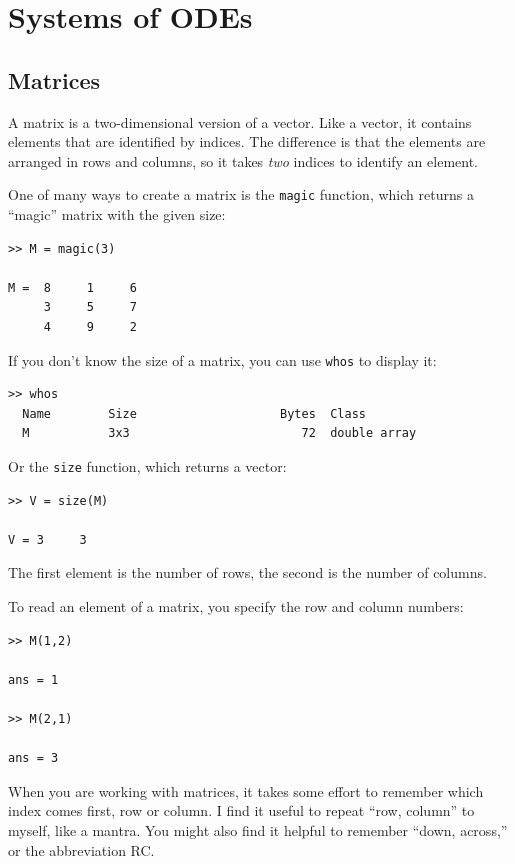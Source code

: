 \documentclass[
]{book}
\begin{document}
\chapter{Systems of ODEs}

\section{Matrices}

A matrix is a two-dimensional version of a vector.  Like a vector,
it contains elements that are identified by indices.  The difference
is that the elements are arranged in rows and columns, so it takes
{\em two} indices to identify an element.

One of many ways to create a matrix is the {\tt magic} function,
which returns a ``magic'' matrix with the given size:

\begin{verbatim}
>> M = magic(3)

M =  8     1     6
     3     5     7
     4     9     2
\end{verbatim}

If you don't know the size of a matrix, you can use {\tt whos} to
display it:

\begin{verbatim}
>> whos
  Name        Size                    Bytes  Class
  M           3x3                        72  double array
\end{verbatim}

Or the {\tt size} function, which returns a vector:

\begin{verbatim}
>> V = size(M)

V = 3     3
\end{verbatim}

The first element is the number of rows, the second is the number of
columns.

To read an element of a matrix, you specify the row and column numbers:

\begin{verbatim}
>> M(1,2)

ans = 1

>> M(2,1)

ans = 3
\end{verbatim}

When you are working with matrices, it takes some effort to remember
which index comes first, row or column.  I find it useful to repeat
``row, column'' to myself, like a mantra.  You might also find it
helpful to remember ``down, across,'' or the abbreviation RC.
\end{document}
